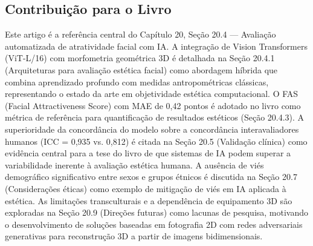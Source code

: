 \subsection{Contribuição para o Livro}
Este artigo é a referência central do Capítulo 20, Seção 20.4 ---
Avaliação automatizada de atratividade facial com IA. A integração
de Vision Transformers (ViT-L/16) com morfometria geométrica 3D é
detalhada na Seção 20.4.1 (Arquiteturas para avaliação estética
facial) como abordagem híbrida que combina aprendizado profundo
com medidas antropométricas clássicas, representando o estado da
arte em objetividade estética computacional. O FAS (Facial
Attractiveness Score) com MAE de 0,42 pontos é adotado no livro
como métrica de referência para quantificação de resultados
estéticos (Seção 20.4.3). A superioridade da concordância do
modelo sobre a concordância interavaliadores humanos (ICC = 0,935
vs. 0,812) é citada na Seção 20.5 (Validação clínica) como
evidência central para a tese do livro de que sistemas de IA podem
superar a variabilidade inerente à avaliação estética humana. A
ausência de viés demográfico significativo entre sexos e grupos
étnicos é discutida na Seção 20.7 (Considerações éticas) como
exemplo de mitigação de viés em IA aplicada à estética. As
limitações transculturais e a dependência de equipamento 3D são
exploradas na Seção 20.9 (Direções futuras) como lacunas de
pesquisa, motivando o desenvolvimento de soluções baseadas em
fotografia 2D com redes adversariais generativas para reconstrução
3D a partir de imagens bidimensionais.

